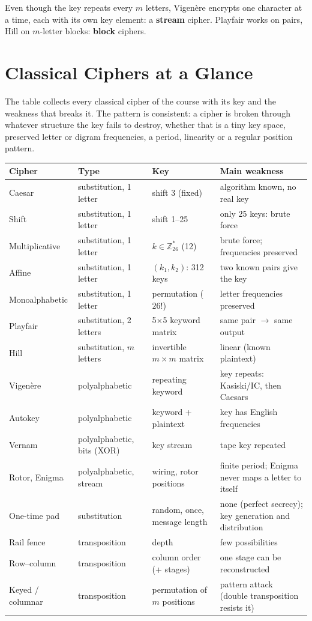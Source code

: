 \begin{trap}
Even though the key repeats every $m$ letters, Vigen\`ere encrypts one character at a time, each with its own key element: a \textbf{stream} cipher. Playfair works on pairs, Hill on $m$-letter blocks: \textbf{block} ciphers.
\end{trap}

\section{Classical Ciphers at a Glance}
The table collects every classical cipher of the course with its key and the weakness that breaks it. The pattern is consistent: a cipher is broken through whatever structure the key fails to destroy, whether that is a tiny key space, preserved letter or digram frequencies, a period, linearity or a regular position pattern.
\begin{center}\small
\begin{tabularx}{\textwidth}{@{}l l l X@{}}
\toprule
Cipher & Type & Key & Main weakness\\
\midrule
Caesar & substitution, 1 letter & shift 3 (fixed) & algorithm known, no real key\\
Shift & substitution, 1 letter & shift 1--25 & only 25 keys: brute force\\
Multiplicative & substitution, 1 letter & $k \in \mathbb{Z}_{26}^*$ (12) & brute force; frequencies preserved\\
Affine & substitution, 1 letter & $(k_1, k_2)$: 312 keys & two known pairs give the key\\
Monoalphabetic & substitution, 1 letter & permutation ($26!$) & letter frequencies preserved\\
Playfair & substitution, 2 letters & 5$\times$5 keyword matrix & same pair $\to$ same output\\
Hill & substitution, $m$ letters & invertible $m\times m$ matrix & linear (known plaintext)\\
Vigen\`ere & polyalphabetic & repeating keyword & key repeats: Kasiski/IC, then Caesars\\
Autokey & polyalphabetic & keyword + plaintext & key has English frequencies\\
Vernam & polyalphabetic, bits (XOR) & key stream & tape key repeated\\
Rotor, Enigma & polyalphabetic, stream & wiring, rotor positions & finite period; Enigma never maps a letter to itself\\
One-time pad & substitution & random, once, message length & none (perfect secrecy); key generation and distribution\\
Rail fence & transposition & depth & few possibilities\\
Row--column & transposition & column order (+ stages) & one stage can be reconstructed\\
Keyed / columnar & transposition & permutation of $m$ positions & pattern attack (double transposition resists it)\\
\bottomrule
\end{tabularx}
\end{center}
